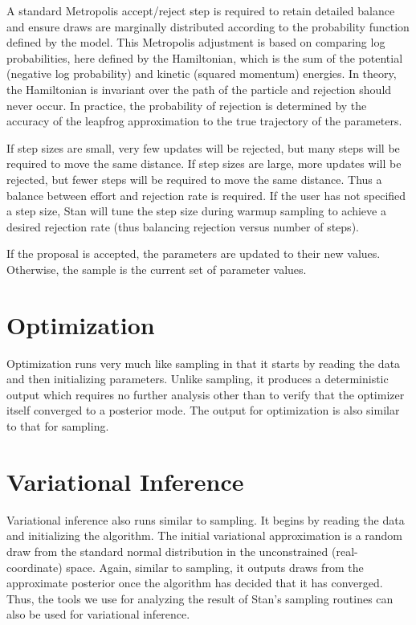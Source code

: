 A standard Metropolis accept/reject step is required to retain detailed
balance and ensure draws are marginally distributed according to the
probability function defined by the model.  This Metropolis adjustment
is based on comparing log probabilities, here defined by the
Hamiltonian, which is the sum of the potential (negative log
probability) and kinetic (squared momentum) energies.  In theory, the
Hamiltonian is invariant over the path of the particle and rejection
should never occur.  In practice, the probability of rejection is
determined by the accuracy of the leapfrog approximation to the true
trajectory of the parameters.

If step sizes are small, very few updates will be rejected, but many
steps will be required to move the same distance.  If step sizes are
large, more updates will be rejected, but fewer steps will be required
to move the same distance.  Thus a balance between effort and
rejection rate is required.  If the user has not specified a step
size, Stan will tune the step size during warmup sampling to achieve
a desired rejection rate (thus balancing rejection versus number of
steps).

If the proposal is accepted, the parameters are updated to their new
values.  Otherwise, the sample is the current set of parameter values.


\section{Optimization}

Optimization runs very much like sampling in that it starts by reading
the data and then initializing parameters.  Unlike sampling, it
produces a deterministic output which requires no further analysis
other than to verify that the optimizer itself converged to a
posterior mode.  The output for optimization is also similar to that
for sampling.


\section{Variational Inference}

Variational inference also runs similar to sampling. It begins by reading the
data and initializing the algorithm. The initial variational approximation is a
random draw from the standard normal distribution in the unconstrained
(real-coordinate) space. Again, similar to sampling, it outputs draws from the
approximate posterior once the algorithm has decided that it has converged.
Thus, the tools we use for analyzing the result of Stan's sampling routines can
also be used for variational inference.



